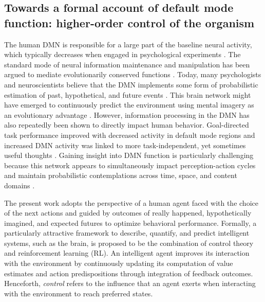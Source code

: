 \documentclass[10pt,letterpaper]{article}
\begin{document}
\subsection{Towards a formal account of default mode function: higher-order control of the organism}
The human DMN is responsible for a large part of the baseline neural activity,
which typically decreases when engaged in psychological experiments
\citep{raichle_baseline}.
The standard mode of
neural information maintenance and manipulation has
been argued to mediate evolutionarily conserved functions
\citep{brown1914nature, binder1999conceptual, buzsaki2006rhythms}.
Today, many psychologists and neuroscientists believe that
the DMN implements some form of
probabilistic estimation of past, hypothetical, and
future events
\citep{fox2005, hassabis2007patients, schacter2007remembering, binder2009,
randy2008, spreng2009common}.
This brain network
might have emerged to continuously predict the environment using
mental imagery as an evolutionary advantage \citep{suddendorf2007evolution}.
%
However, information processing in the DMN has also repeatedly
been shown to directly impact human behavior. Goal-directed task performance
improved with decreased activity in default mode regions \citep{weiss2006}
and increased DMN activity was linked to more task-independent,
yet sometimes useful thoughts
\citep{mason2007, seli2016mind}.
%
Gaining insight into DMN function is
particularly challenging because
this network appears to
simultaneously impact perception-action cycles and
maintain probabilistic contemplations
across time, space, and content domains
\citep{boyer2008evolutionary}.


The present work adopts the perspective of
a human agent faced with the choice of the next actions
and guided by outcomes
of really happened, hypothetically imagined, and
expected futures to optimize behavioral performance.
Formally, a particularly attractive framework
to describe, quantify, and predict intelligent systems, such as the brain,
is proposed to be the combination of control theory and
reinforcement learning (RL).
An intelligent agent improves its interaction with the environment
by continuously updating its computation of value estimates and action predispositions
through integration of feedback outcomes.
Henceforth,
\textit{control} refers to the influence that an agent exerts when interacting
with the environment to reach preferred states.
\end{document}
